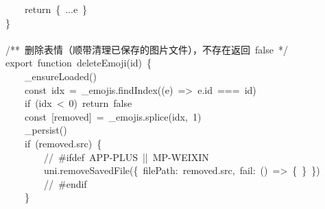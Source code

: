 \documentclass[a4paper,10pt]{article}
\begin{document}
{~~~~return~\{~...e~\}\\
\}\\
\mbox{}\\
/**~删除表情（顺带清理已保存的图片文件），不存在返回~false~*/\\
export~function~deleteEmoji(id)~\{\\
~~~~\_ensureLoaded()\\
~~~~const~idx~=~\_emojis.findIndex((e)~=>~e.id~===~id)\\
~~~~if~(idx~<~0)~return~false\\
~~~~const~[removed]~=~\_emojis.splice(idx,~1)\\
~~~~\_persist()\\
~~~~if~(removed.src)~\{\\
~~~~~~~~//~\#ifdef~APP-PLUS~||~MP-WEIXIN\\
~~~~~~~~uni.removeSavedFile(\{~filePath:~removed.src,~fail:~()~=>~\{~\}~\})\\
~~~~~~~~//~\#endif\\
~~~~\}
}

\newpage
\end{document}
